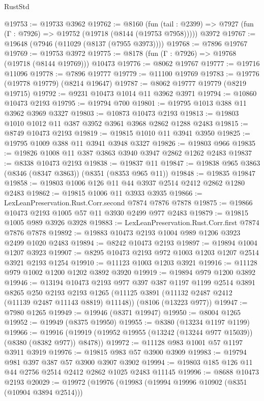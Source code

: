 \begin{lexlean}{RustStd}
\begin{coremodule}
@19753 := @19733 @3962
@19762 := @8160
    (fun (tail : @2399) => @7927 (fun (Γ : @7926) => @19752 (@19718 (@8144 (@19753 @7958)))))
    @3972
@19767 := @19648 (@7946 (@11029 (@8137 (@7955 @3973))))
@19768 := @7896 @19767
@19769 := @19753 @3972
@19775 := @8178 (fun (Γ : @7926) => @19768 (@19718 (@8144 @19769))) @10473
@19776 := @8062 @19767
@19777 := @19716 @11096
@19778 := @7896 @19777
@19779 := @11100 @19769
@19783 := @19776 (@19778 @19779) (@8214 @19647)
@19787 := @8062 @19777 @19779 (@8219 @19715)
@19792 := @9231 @10473 @1014 @11 @3962 @3971
@19794 := @10860 @10473 @2193
@19795 := @19794 @700
@19801 := @19795 @1013 @388 @11 @3962 @3969 @3327
@19803 := @10873 @10473 @2193
@19813 := @19803 @1010 @1012 @11 @387 @3952 @3961 @3968 @2862 @1288 @2483
@19815 := @8749 @10473 @2193
@19819 := @19815 @1010 @11 @3941 @3950
@19825 := @19795 @1009 @388 @11 @3941 @3948 @3327
@19826 := @19803 @966
@19835 := @19826 @1008 @11 @387 @3863 @3940 @3947 @2862 @1262 @2483
@19837 := @8338 @10473 @2193
@19838 := @19837 @11
@19847 := @19838 @965 @3863 (@8346 (@8347 @3863)) (@8351 (@8353 @965 @11))
@19848 := @19835 @19847
@19858 := @19803 @1006 @126 @11 @44 @3937 @2514 @2412 @2862 @1280 @2483
@19862 := @19815 @1006 @11 @3933 @3935
@19866 := LexLeanPreservation.Rust.Corr.second @7874 @7876 @7878
@19875 := @19866 @10473 @2193 @1005 @57 @11 @3930 @2499 @977 @2483
@19879 := @19815 @1005 @989 @3926 @3928
@19883 := LexLeanPreservation.Rust.Corr.first @7874 @7876 @7878
@19892 := @19883 @10473 @2193 @1004 @989 @1206 @3923 @2499 @1020 @2483
@19894 := @8242 @10473 @2193
@19897 := @19894 @1004 @1207 @3923
@19907 := @8295 @10473 @2193 @972 @1003 @1203 @1207 @2514 @3921 @2193 @1254
@19910 := @11123 @1003 @1203 @3921
@19916 := @11128 @979 @1002 @1200 @1202 @3892 @3920
@19919 := @19894 @979 @1200 @3892
@19946 := @13194
    @10473
    @2193
    @977
    @397
    @387
    @1197
    @1199
    @2514
    @3891
    @8265
    @250
    @2193
    @2193
    @1265
    (@11125 @3891 (@11132 @2487 @2412 (@11139 @2487 @11143 @8819) @11148))
    (@8106 (@13223 @977))
@19947 := @7980 @1265
@19949 := @19946 (@8371 @19947)
@19950 := @8004 @1265
@19952 := @19949 (@8375 @19950)
@19955 := @8380 (@13234 @1197 @1199)
@19966 := @19916 (@19919 (@19952 @19955 (@13242 (@13244 @977 @15039)) (@8380 (@8382 @977)) @8478))
@19972 := @11128 @983 @1001 @57 @1197 @3911 @3919
@19976 := @19815 @983 @57 @3900 @3909
@19983 := @19794 @981 @397 @387 @57 @3900 @3907 @3902
@19994 := @19803 @185 @126 @11 @44 @2756 @2514 @2412 @2862 @1025 @2483 @11145
@19996 := @8688 @10473 @2193
@20029 := @19972
    (@19976
      (@19983
        (@19994 @19996 @10902 (@8351 (@10904 @3894 @2514)))

\end{coremodule}
\end{lexlean}
